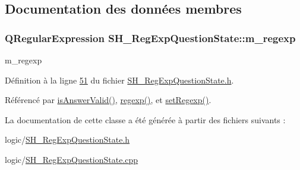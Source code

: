 \subsection{Documentation des données membres}
\hypertarget{classSH__RegExpQuestionState_a82543a3535f8dcb09942bfab8acf3323}{
\subsubsection[{m\-\_\-regexp}]{\setlength{\rightskip}{0pt plus 5cm}Q\-Regular\-Expression S\-H\-\_\-\-Reg\-Exp\-Question\-State\-::m\-\_\-regexp\hspace{0.3cm}{\ttfamily [private]}}}\label{classSH__RegExpQuestionState_a82543a3535f8dcb09942bfab8acf3323}


m\-\_\-regexp 



Définition à la ligne \hyperlink{SH__RegExpQuestionState_8h_source_l00051}{51} du fichier \hyperlink{SH__RegExpQuestionState_8h_source}{S\-H\-\_\-\-Reg\-Exp\-Question\-State.\-h}.



Référencé par \hyperlink{classSH__RegExpQuestionState_a6625c6720ebcad6b6411e5275c36157b}{is\-Answer\-Valid()}, \hyperlink{classSH__RegExpQuestionState_a5fe3fd070e922885a127029ce2e80b6c}{regexp()}, et \hyperlink{classSH__RegExpQuestionState_af2d648d2bd8c3435d83c8e331bbbfcfb}{set\-Regexp()}.



La documentation de cette classe a été générée à partir des fichiers suivants \-:\begin{DoxyCompactItemize}
\item 
logic/\hyperlink{SH__RegExpQuestionState_8h}{S\-H\-\_\-\-Reg\-Exp\-Question\-State.\-h}\item 
logic/\hyperlink{SH__RegExpQuestionState_8cpp}{S\-H\-\_\-\-Reg\-Exp\-Question\-State.\-cpp}\end{DoxyCompactItemize}
